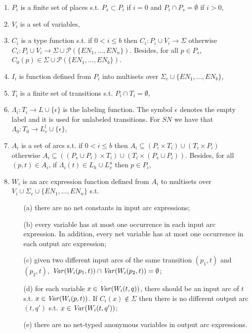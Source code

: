 \documentclass{llncs}
\begin{document}
\begin{definition}
\begin{enumerate}
    \item $P_i$ is a finite set of places s.t. $P_s\subset P_i$ if $i=0$ and $P_i\cap P_s=\emptyset$ if $i>0$,
    \item $V_i$ is a set of variables,
    \item $C_i$ is a type function s.t. if $0<i\leq b$ then  $C_i:P_i\cup V_i \to \Sigma$ otherwise $C_i:P_i\cup V_i \to \Sigma\cup \mathcal{P}(\{EN_1,\ldots, EN_n\})$. Besides, for all $p\in P_s$, $C_0(p)\in\Sigma\cup\mathcal{P}(\{EN_1,\ldots, EN_b\})$.
    \item $I_i$ is function defined from $P_i$ into multisets over $\Sigma_c\cup\{EN_1,\ldots, EN_b\}$,
    \item $T_i$ is a finite set of transitions s.t. $P_i\cap T_i=\emptyset$,
    \item $\Lambda_i:T_i\to L\cup\{\epsilon\}$ is the labeling function. The symbol $\epsilon$ denotes the empty label and it is used for unlabeled transitions. For $SN$ we have that $\Lambda_0:T_0\to L_v^l\cup\{\epsilon\}$,
    \item $A_i$ is a set of arcs s.t. if $0<i\leq b$ then $A_i\subseteq (P_i\times T_i) \cup (T_i \times P_i)$ otherwise $A_i\subseteq ((P_s\cup P_i) \times T_i) \cup (T_i \times (P_s\cup P_i))$. Besides, for all $(p,t)\in A_i$, if $\Lambda_i(t)\in L_h\cup L_v^u$ then $p\in P_i$,
    \item $W_i$ is an arc expression function defined from $A_i$ to multisets over $V_i\cup\Sigma_c\cup\{EN_1,\ldots, EN_n\}$ s.t.
    \begin{enumerate}
        \item[(a)] there are no net constants in input arc expressions;
        \item[(b)] every variable has at most one occurrence in each input arc expression. In addition, every net variable has at most one occurrence in each output arc expression;
        \item[(c)] given two different input arcs of the same transition $(p_1, t)$ and $(p_2, t)$, ${\it Var}(W_i(p_1, t))\cap {\it Var}(W_i(p_2, t))=\emptyset$;
        \item[(d)] for each variable $x\in {\it Var}(W_i(t, q))$, there should be an input arc of $t$ s.t. $x\in {\it Var}(W_i(p, t))$.
        If $C_i(x)\notin \Sigma$ then there is no different output arc $(t, q')$ s.t.  $x\in {\it Var}(W_i(t,q'))$;
        \item[(e)] there are no net-typed anonymous variables in output arc expressions.
    \end{enumerate}
\end{enumerate}

\end{definition}
\end{document}
